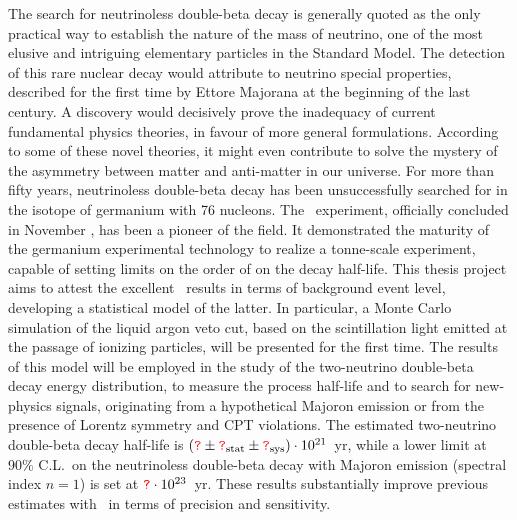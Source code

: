 
The search for neutrinoless double-beta decay is generally quoted as the only practical
way to establish the nature of the mass of neutrino, one of the most elusive and intriguing
elementary particles in the Standard Model. The detection of this rare nuclear decay would
attribute to neutrino special properties, described for the first time by Ettore Majorana
at the beginning of the last century. A discovery would decisively prove the inadequacy of
current fundamental physics theories, in favour of more general formulations. According to
some of these novel theories, it might even contribute to solve the mystery of the
asymmetry between matter and anti-matter in our universe. For more than fifty years,
neutrinoless double-beta decay has been unsuccessfully searched for in the isotope of
germanium with 76 nucleons.  The \gerda\ experiment, officially concluded in November
, has been a pioneer of the field. It demonstrated the maturity of the germanium
experimental technology to realize a tonne-scale experiment, capable of setting limits on
the order of  on the decay half-life. This thesis project aims to attest the
excellent \gerda\ results in terms of background event level, developing a statistical
model of the latter. In particular, a Monte Carlo simulation of the liquid argon veto cut,
based on the scintillation light emitted at the passage of ionizing particles, will be
presented for the first time. The results of this model will be employed in the study of
the two-neutrino double-beta decay energy distribution, to measure the process half-life
and to search for new-physics signals, originating from a hypothetical Majoron emission or
from the presence of Lorentz symmetry and CPT violations. The estimated two-neutrino
double-beta decay half-life is $(\textcolor{red}{\texttt{?}} \pm {\textcolor{red}{\texttt{?}}}_\text{stat} \pm {\textcolor{red}{\texttt{?}}}_\text{sys})
\cdot 10^{21}$~yr, while a lower limit at 90\% C.L.~on the neutrinoless double-beta decay
with Majoron emission (spectral index $n=1$) is set at $\textcolor{red}{\texttt{?}} \cdot 10^{23}$~yr.
These results substantially improve previous estimates with \gesix\ in terms of precision
and sensitivity.


